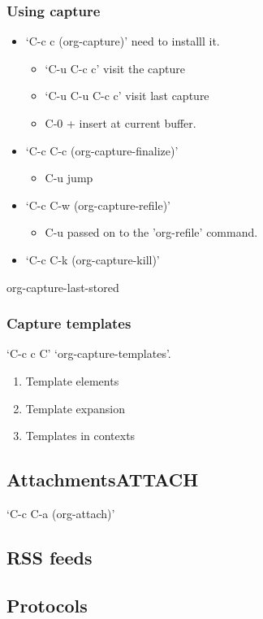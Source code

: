 \documentclass[11pt]{article}
\begin{document}
\subsubsection{Using capture}
\label{sec:org5a7057f}
\begin{itemize}
\item ‘C-c c     (org-capture)’ need to installl it.
\begin{itemize}
\item ‘C-u C-c c’ visit the capture
\item ‘C-u C-u C-c c’ visit last capture
\item C-0 + insert at current buffer.
\end{itemize}
\item ‘C-c C-c     (org-capture-finalize)’
\begin{itemize}
\item C-u jump
\end{itemize}
\item ‘C-c C-w     (org-capture-refile)’
\begin{itemize}
\item C-u passed on to the 'org-refile' command.
\end{itemize}
\item ‘C-c C-k     (org-capture-kill)’
\end{itemize}
org-capture-last-stored
\subsubsection{Capture templates}
\label{sec:org155f4c7}
‘C-c c C’  ‘org-capture-templates’.
\begin{enumerate}
\item Template elements
\label{sec:orgf25d2d2}
\item Template expansion
\label{sec:org39eb0fb}
\item Templates in contexts
\label{sec:org6686b9c}
\end{enumerate}
\subsection{Attachments\hfill{}\textsc{ATTACH}}
\label{sec:org4d15241}
‘C-c C-a     (org-attach)’
\subsection{RSS feeds}
\label{sec:org8f6083c}
\subsection{Protocols}
\label{sec:org97f16b0}
\end{document}
